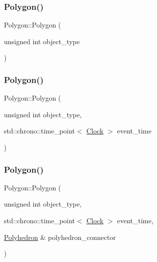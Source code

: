 \mbox{\label{classPolygon_a023fe85caf3682e46fb6d15d03da3435}} 
\subsubsection{\texorpdfstring{Polygon()}{Polygon()}\hspace{0.1cm}{\footnotesize\ttfamily [2/4]}}
{\footnotesize\ttfamily Polygon\+::\+Polygon (\begin{DoxyParamCaption}\item[{unsigned int}]{object\+\_\+type }\end{DoxyParamCaption})\hspace{0.3cm}{\ttfamily [inline]}}

\mbox{\label{classPolygon_aa2a7d4a8a7765c45b834a7ecc198e0c3}} 
\subsubsection{\texorpdfstring{Polygon()}{Polygon()}\hspace{0.1cm}{\footnotesize\ttfamily [3/4]}}
{\footnotesize\ttfamily Polygon\+::\+Polygon (\begin{DoxyParamCaption}\item[{unsigned int}]{object\+\_\+type,  }\item[{std\+::chrono\+::time\+\_\+point$<$ \mbox{\hyperlink{universe_8h_a0ef8d951d1ca5ab3cfaf7ab4c7a6fd80}{Clock}} $>$}]{event\+\_\+time }\end{DoxyParamCaption})\hspace{0.3cm}{\ttfamily [inline]}}

\mbox{\label{classPolygon_a581ad88f80bf40668e6c8b928c908bcb}} 
\subsubsection{\texorpdfstring{Polygon()}{Polygon()}\hspace{0.1cm}{\footnotesize\ttfamily [4/4]}}
{\footnotesize\ttfamily Polygon\+::\+Polygon (\begin{DoxyParamCaption}\item[{unsigned int}]{object\+\_\+type,  }\item[{std\+::chrono\+::time\+\_\+point$<$ \mbox{\hyperlink{universe_8h_a0ef8d951d1ca5ab3cfaf7ab4c7a6fd80}{Clock}} $>$}]{event\+\_\+time,  }\item[{\mbox{\hyperlink{classPolyhedron}{Polyhedron}} \&}]{polyhedron\+\_\+connector }\end{DoxyParamCaption})\hspace{0.3cm}{\ttfamily [inline]}}

